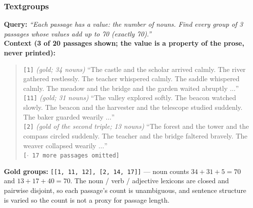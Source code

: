 %
\subsubsection{Textgroups}

\textbf{Query:} \emph{``Each passage has a value: the number of nouns. Find every group of 3 passages
whose values add up to 70 (exactly 70).''}\\
\textbf{Context (3 of 20 passages shown; the value is a property of the prose, never printed):}
\begin{quote}\small
\texttt{[1]} \emph{(gold; 34 nouns)} ``The castle and the scholar arrived calmly. The river gathered
restlessly. The teacher whispered calmly. The saddle whispered calmly. The meadow and the bridge and
the garden waited abruptly $\dots$''\\
\texttt{[11]} \emph{(gold; 31 nouns)} ``The valley explored softly. The beacon watched slowly. The
beacon and the harvester and the telescope studied suddenly. The baker guarded wearily $\dots$''\\
\texttt{[2]} \emph{(gold of the second triple; 13 nouns)} ``The forest and the tower and the compass
circled suddenly. The teacher and the bridge faltered bravely. The weaver collapsed wearily
$\dots$''\\
\texttt{[$\cdot$ 17 more passages omitted]}
\end{quote}
\textbf{Gold groups:} \texttt{[[1, 11, 12], [2, 14, 17]]} --- noun counts $34{+}31{+}5 = 70$ and
$13{+}17{+}40 = 70$. The noun / verb / adjective lexicons are closed and pairwise disjoint, so each
passage's count is unambiguous, and sentence structure is varied so the count is not a proxy for
passage length.
